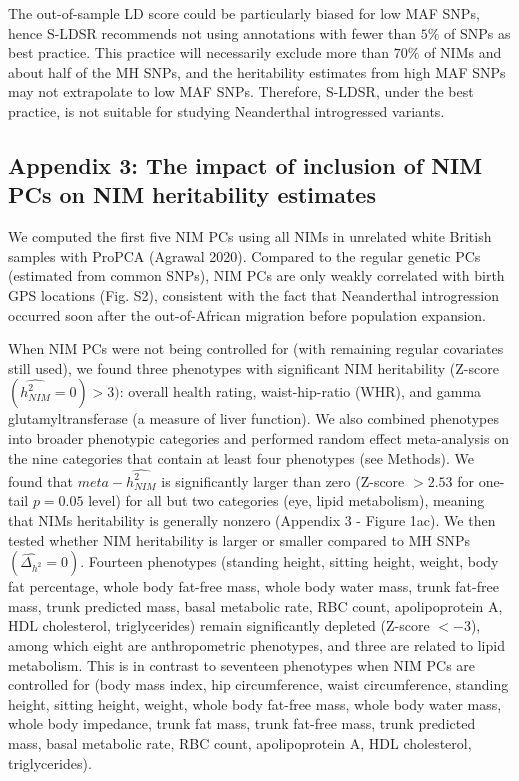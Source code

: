 The out-of-sample LD score could be particularly biased for low MAF SNPs, hence S-LDSR recommends not using annotations with fewer than $5\%$ of SNPs as best practice. This practice will necessarily exclude more than $70\%$ of NIMs and about half of the MH SNPs, and the heritability estimates from high MAF SNPs may not extrapolate to low MAF SNPs. Therefore, S-LDSR, under the best practice, is not suitable for studying Neanderthal introgressed variants. 

\subsection{Appendix 3: The impact of inclusion of NIM PCs on NIM heritability estimates}
We computed the first five NIM PCs using all NIMs in unrelated white British samples with ProPCA (Agrawal 2020). Compared to the regular genetic PCs (estimated from common SNPs), NIM PCs are only weakly correlated with birth GPS locations (Fig. S2), consistent with the fact that Neanderthal introgression occurred soon after the out-of-African migration before population expansion. 

When NIM PCs were not being controlled for (with remaining regular covariates still used), we found three phenotypes with significant NIM heritability (Z-score $(\hat{h_{NIM}^2}=0) > 3)$: overall health rating, waist-hip-ratio (WHR), and gamma glutamyltransferase (a measure of liver function). We also combined phenotypes into broader phenotypic categories and performed random effect meta-analysis on the nine categories that contain at least four phenotypes (see Methods). We found that $meta-\hat{h_{NIM}^2}$ is significantly larger than zero  (Z-score $> 2.53$ for one-tail $p = 0.05$ level) for all but two categories (eye, lipid metabolism), meaning that NIMs heritability is generally nonzero (Appendix 3 - Figure 1ac). We then tested whether NIM heritability is larger or smaller compared to MH SNPs  $(\hat{\Delta_{h^2}} = 0)$. Fourteen phenotypes (standing height, sitting height, weight, body fat percentage, whole body fat-free mass, whole body water mass, trunk fat-free mass, trunk predicted mass, basal metabolic rate, RBC count, apolipoprotein A, HDL cholesterol, triglycerides) remain significantly depleted (Z-score $< -3$), among which eight are anthropometric phenotypes, and three are related to lipid metabolism. This is in contrast to seventeen phenotypes when NIM PCs are controlled for (body mass index, hip circumference, waist circumference, standing height, sitting height, weight, whole body fat-free mass, whole body water mass, whole body impedance, trunk fat mass, trunk fat-free mass, trunk predicted mass, basal metabolic rate, RBC count, apolipoprotein A, HDL cholesterol, triglycerides). 

